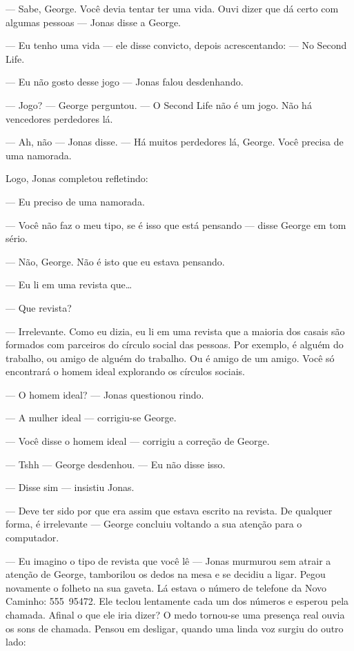 --- Sabe, George. Você devia tentar ter uma vida. Ouvi dizer que dá certo com algumas pessoas --- Jonas disse a George.

--- Eu tenho uma vida --- ele disse convicto, depois acrescentando: --- No Second Life.

--- Eu não gosto desse jogo --- Jonas falou desdenhando.

--- Jogo? --- George perguntou. --- O Second Life não é um jogo. Não há vencedores  perdedores lá.

--- Ah, não --- Jonas disse. --- Há muitos perdedores lá, George. Você precisa de uma namorada.

Logo, Jonas completou refletindo:

--- Eu preciso de uma namorada.

--- Você não faz o meu tipo, se é isso que está pensando --- disse George em tom sério.

--- Não, George. Não é isto que eu estava pensando.

--- Eu li em uma revista que\ldots

--- Que revista?

--- Irrelevante. Como eu dizia, eu li em uma revista que a maioria dos casais são formados com parceiros do círculo social das pessoas. Por exemplo, é alguém do trabalho, ou amigo de alguém do trabalho. Ou é amigo de um amigo. Você só encontrará o homem ideal explorando os círculos sociais.

--- O homem ideal? --- Jonas questionou rindo.

--- A mulher ideal --- corrigiu-se George.

--- Você disse o homem ideal --- corrigiu a correção de George.

--- Tshh ---  George desdenhou. --- Eu não disse isso.

--- Disse sim --- insistiu Jonas.

--- Deve ter sido por que era assim que estava escrito na revista. De qualquer forma, é irrelevante --- George concluiu voltando a sua atenção para o computador.

--- Eu imagino o tipo de revista que você lê --- Jonas murmurou sem atrair a atenção de George, tamborilou os dedos na mesa e se decidiu a ligar. Pegou novamente o folheto na sua gaveta. Lá estava o número de telefone da Novo Caminho: 555~95472. Ele teclou lentamente cada um dos números e esperou pela chamada. Afinal o que ele iria dizer? O medo tornou-se uma presença real  ouvia os sons de chamada. Pensou em desligar, quando uma linda voz surgiu do outro lado:


